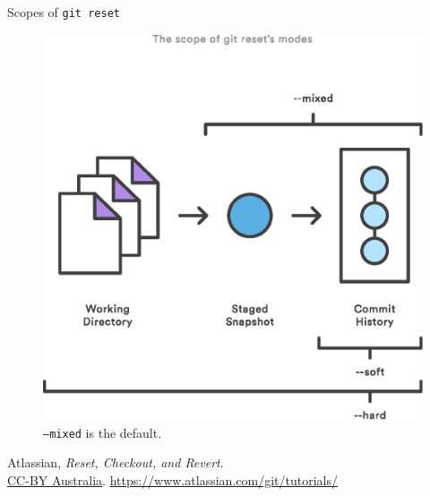 \begin{frame}{Scopes of \texttt{git reset}}
  \begin{figure}
    \includegraphics[scale=0.4]{reset_scopes.eps}
    \\ \texttt{--mixed} is the default.
  \end{figure}
  \footnotesize{Atlassian,
    \emph{Reset, Checkout, and Revert}.\\
    \href{http://creativecommons.org/licenses/by/2.5/au/legalcode}{CC-BY Australia}.
    \href{https://www.atlassian.com/git/tutorials/}
    {https://www.atlassian.com/git/tutorials/}}

\end{frame}


